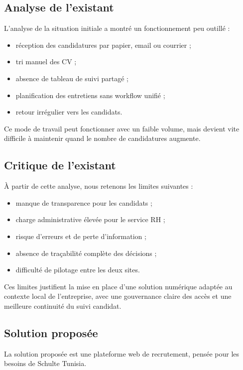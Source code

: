 \subsection{Analyse de l'existant}

L'analyse de la situation initiale a montré un fonctionnement peu outillé :
\begin{itemize}
    \item réception des candidatures par papier, email ou courrier ;
    \item tri manuel des CV ;
    \item absence de tableau de suivi partagé ;
    \item planification des entretiens sans workflow unifié ;
    \item retour irrégulier vers les candidats.
\end{itemize}

Ce mode de travail peut fonctionner avec un faible volume, mais devient
vite difficile à maintenir quand le nombre de candidatures augmente.

\subsection{Critique de l'existant}

À partir de cette analyse, nous retenons les limites suivantes :
\begin{itemize}
    \item manque de transparence pour les candidats ;
    \item charge administrative élevée pour le service RH ;
    \item risque d'erreurs et de perte d'information ;
    \item absence de traçabilité complète des décisions ;
    \item difficulté de pilotage entre les deux sites.
\end{itemize}

Ces limites justifient la mise en place d'une solution numérique adaptée
au contexte local de l'entreprise, avec une gouvernance claire des accès
et une meilleure continuité du suivi candidat.

\subsection{Solution proposée}

La solution proposée est une plateforme web de recrutement, pensée pour
les besoins de Schulte Tunisia.

